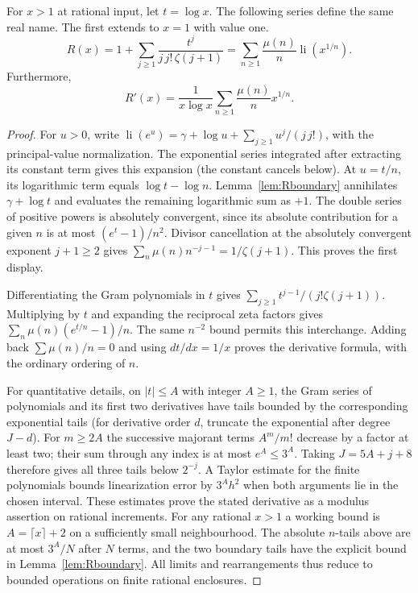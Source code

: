 \begin{theorem}
For $x>1$ at rational input, let $t=\log x$. The following series define the same real name. The first extends to $x=1$ with value one.
\[
 R(x)=1+\sum_{j\ge1}\frac{t^j}{j\,j!\,\zeta(j+1)}
      =\sum_{n\ge1}\frac{\mu(n)}n\operatorname{li}(x^{1/n}).
\]
Furthermore,
\[
 R'(x)=\frac1{x\log x}\sum_{n\ge1}\frac{\mu(n)}n x^{1/n}.
\]
\end{theorem}
\begin{proof}
For $u>0$, write
$\operatorname{li}(e^u)=\gamma+\log u+\sum_{j\ge1}u^j/(j\,j!)$,
with the principal-value normalization. The exponential series integrated after extracting its constant term gives this expansion (the constant cancels below). At $u=t/n$, its logarithmic term equals $\log t-\log n$. Lemma~\ref{lem:Rboundary} annihilates $\gamma+\log t$ and evaluates the remaining logarithmic sum as $+1$. The double series of positive powers is absolutely convergent, since its absolute contribution for a given $n$ is at most $(e^t-1)/n^2$. Divisor cancellation at the absolutely convergent exponent $j+1\ge2$ gives
$\sum_n\mu(n)n^{-j-1}=1/\zeta(j+1)$. This proves the first display.

Differentiating the Gram polynomials in $t$ gives
$\sum_{j\ge1}t^{j-1}/(j!\zeta(j+1))$. Multiplying by $t$ and expanding the reciprocal zeta factors gives $\sum_n \mu(n)(e^{t/n}-1)/n$. The same $n^{-2}$ bound permits this interchange. Adding back $\sum\mu(n)/n=0$ and using $dt/dx=1/x$ proves the derivative formula, with the ordinary ordering of $n$.

For quantitative details, on $|t|\le A$ with integer $A\ge1$, the Gram series of polynomials and its first two derivatives have tails bounded by the corresponding exponential tails (for derivative order $d$, truncate the exponential after degree $J-d$). For $m\ge2A$ the successive majorant terms $A^m/m!$ decrease by a factor at least two; their sum through any index is at most $e^A\le3^A$. Taking $J=5A+j+8$ therefore gives all three tails below $2^{-j}$. A Taylor estimate for the finite polynomials bounds linearization error by $3^A h^2$ when both arguments lie in the chosen interval. These estimates prove the stated derivative as a modulus assertion on rational increments. For any rational $x>1$ a working bound is $A=\lceil x\rceil+2$ on a sufficiently small neighbourhood. The absolute $n$-tails above are at most $3^A/N$ after $N$ terms, and the two boundary tails have the explicit bound in Lemma~\ref{lem:Rboundary}. All limits and rearrangements thus reduce to bounded operations on finite rational enclosures.
\end{proof}
